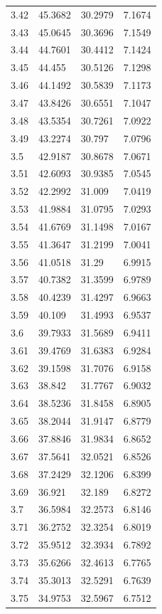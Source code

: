 \begin{tabular}{llll}
3.42 & 45.3682 & 30.2979 & 7.1674 \\
3.43 & 45.0645 & 30.3696 & 7.1549 \\
3.44 & 44.7601 & 30.4412 & 7.1424 \\
3.45 & 44.455 & 30.5126 & 7.1298 \\
3.46 & 44.1492 & 30.5839 & 7.1173 \\
3.47 & 43.8426 & 30.6551 & 7.1047 \\
3.48 & 43.5354 & 30.7261 & 7.0922 \\
3.49 & 43.2274 & 30.797 & 7.0796 \\
3.5 & 42.9187 & 30.8678 & 7.0671 \\
3.51 & 42.6093 & 30.9385 & 7.0545 \\
3.52 & 42.2992 & 31.009 & 7.0419 \\
3.53 & 41.9884 & 31.0795 & 7.0293 \\
3.54 & 41.6769 & 31.1498 & 7.0167 \\
3.55 & 41.3647 & 31.2199 & 7.0041 \\
3.56 & 41.0518 & 31.29 & 6.9915 \\
3.57 & 40.7382 & 31.3599 & 6.9789 \\
3.58 & 40.4239 & 31.4297 & 6.9663 \\
3.59 & 40.109 & 31.4993 & 6.9537 \\
3.6 & 39.7933 & 31.5689 & 6.9411 \\
3.61 & 39.4769 & 31.6383 & 6.9284 \\
3.62 & 39.1598 & 31.7076 & 6.9158 \\
3.63 & 38.842 & 31.7767 & 6.9032 \\
3.64 & 38.5236 & 31.8458 & 6.8905 \\
3.65 & 38.2044 & 31.9147 & 6.8779 \\
3.66 & 37.8846 & 31.9834 & 6.8652 \\
3.67 & 37.5641 & 32.0521 & 6.8526 \\
3.68 & 37.2429 & 32.1206 & 6.8399 \\
3.69 & 36.921 & 32.189 & 6.8272 \\
3.7 & 36.5984 & 32.2573 & 6.8146 \\
3.71 & 36.2752 & 32.3254 & 6.8019 \\
3.72 & 35.9512 & 32.3934 & 6.7892 \\
3.73 & 35.6266 & 32.4613 & 6.7765 \\
3.74 & 35.3013 & 32.5291 & 6.7639 \\
3.75 & 34.9753 & 32.5967 & 6.7512 \\

\end{tabular}
